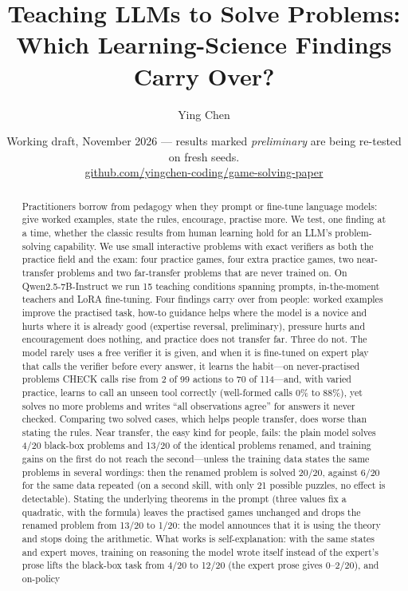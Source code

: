 \documentclass[11pt]{article}
\title{Teaching LLMs to Solve Problems:\\Which Learning-Science Findings Carry Over?}
\author{Ying Chen}
\date{Working draft, November 2026 --- results marked \emph{preliminary} are being re-tested on fresh seeds.\\
\href{https://github.com/yingchen-coding/game-solving-paper}{github.com/yingchen-coding/game-solving-paper}}
\begin{document}
\maketitle

\begin{abstract}
Practitioners borrow from pedagogy when they prompt or fine-tune language models: give worked examples, state the
rules, encourage, practise more. We test, one finding at a time, whether the classic results from human learning
hold for an LLM's problem-solving capability. We use small interactive problems with exact verifiers as both the
practice field and the exam: four practice games, four extra practice games, two near-transfer problems and two
far-transfer problems that are never trained on. On Qwen2.5-7B-Instruct we run 15 teaching conditions spanning
prompts, in-the-moment teachers and LoRA fine-tuning. Four findings carry over from people: worked examples
improve the practised task, how-to guidance helps where the model is a novice and hurts where it is already good
(expertise reversal, preliminary), pressure hurts and encouragement does nothing, and practice does not transfer
far. Three do not. The model rarely uses a free verifier it is given, and when it is fine-tuned on expert play that
calls the verifier before every answer, it learns the habit---on never-practised problems CHECK calls rise from
2 of 99 actions to 70 of 114---and, with varied practice, learns to call an unseen tool correctly (well-formed calls
0\% to 88\%), yet solves no more problems and writes ``all observations agree'' for answers it never checked.
Comparing two solved cases, which helps people transfer, does worse than stating the rules. Near transfer, the
easy kind for people, fails: the plain model solves 4/20 black-box problems and 13/20 of the identical problems
renamed, and training gains on the first do not reach the second---unless the training data states the same
problems in several wordings: then the renamed problem is solved 20/20, against 6/20 for the same data repeated
(on a second skill, with only 21 possible puzzles, no effect is detectable). Stating the underlying theorems in the prompt
(three values fix a quadratic, with the formula) leaves the practised games unchanged and drops the renamed problem
from 13/20 to 1/20: the model announces that it is using the theory and stops doing the arithmetic. What works is
self-explanation: with the same states and expert moves, training on reasoning the model wrote itself instead of
the expert's prose lifts the black-box task from 4/20 to 12/20 (the expert prose gives 0--2/20), and on-policy

\end{abstract}
\end{document}
